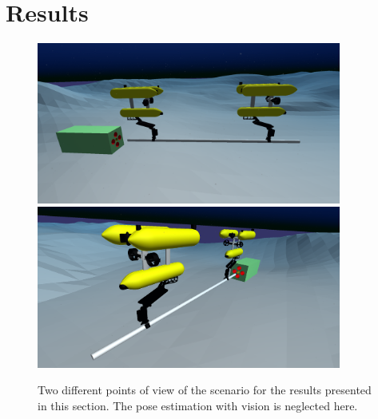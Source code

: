 \section{Results}
\label{sec:resultNoVisio}
\begin{figure}[H]
	\centering
	\includegraphics[width=10cm]{scenario_onlyTwin.png}
	\includegraphics[width=10cm]{scenario_onlyTwin2.png}
	
	\caption[Scenario for tests without the vision part]{Two different points of view of the scenario for the results presented in this section. The pose estimation with vision is neglected here.}
	\label{fig:onlyTwin_uwsim}
\end{figure}

